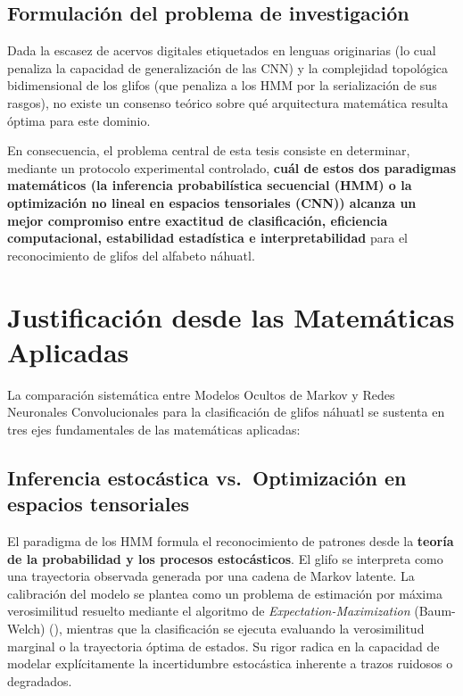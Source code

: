 \documentclass[
  spanish,
  us-letterpaper,
]{scrreprt}
\theoremstyle{definition}
\theoremstyle{remark}
\begin{document}
\subsection{Formulación del problema de
investigación}\label{formulaciuxf3n-del-problema-de-investigaciuxf3n}

Dada la escasez de acervos digitales etiquetados en lenguas originarias
(lo cual penaliza la capacidad de generalización de las CNN) y la
complejidad topológica bidimensional de los glifos (que penaliza a los
HMM por la serialización de sus rasgos), no existe un consenso teórico
sobre qué arquitectura matemática resulta óptima para este dominio.

En consecuencia, el problema central de esta tesis consiste en
determinar, mediante un protocolo experimental controlado, \textbf{cuál
de estos dos paradigmas matemáticos (la inferencia probabilística
secuencial (HMM) o la optimización no lineal en espacios tensoriales
(CNN)) alcanza un mejor compromiso entre exactitud de clasificación,
eficiencia computacional, estabilidad estadística e interpretabilidad}
para el reconocimiento de glifos del alfabeto náhuatl.

\section{Justificación desde las Matemáticas
Aplicadas}\label{justificaciuxf3n-desde-las-matemuxe1ticas-aplicadas}

La comparación sistemática entre Modelos Ocultos de Markov y Redes
Neuronales Convolucionales para la clasificación de glifos náhuatl se
sustenta en tres ejes fundamentales de las matemáticas aplicadas:

\subsection{Inferencia estocástica vs.~Optimización en espacios
tensoriales}\label{inferencia-estocuxe1stica-vs.-optimizaciuxf3n-en-espacios-tensoriales}

El paradigma de los HMM formula el reconocimiento de patrones desde la
\textbf{teoría de la probabilidad y los procesos estocásticos}. El glifo
se interpreta como una trayectoria observada generada por una cadena de
Markov latente. La calibración del modelo se plantea como un problema de
estimación por máxima verosimilitud resuelto mediante el algoritmo de
\emph{Expectation-Maximization} (Baum-Welch)
(), mientras que la
clasificación se ejecuta evaluando la verosimilitud marginal o la
trayectoria óptima de estados. Su rigor radica en la capacidad de
modelar explícitamente la incertidumbre estocástica inherente a trazos
ruidosos o degradados.
\end{document}
